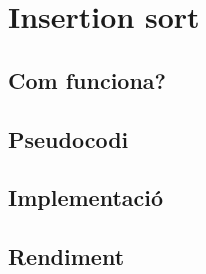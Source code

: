 \chapter{Insertion sort}

\section{Com funciona?}
\section{Pseudocodi}
\section{Implementació}

\section{Rendiment}
